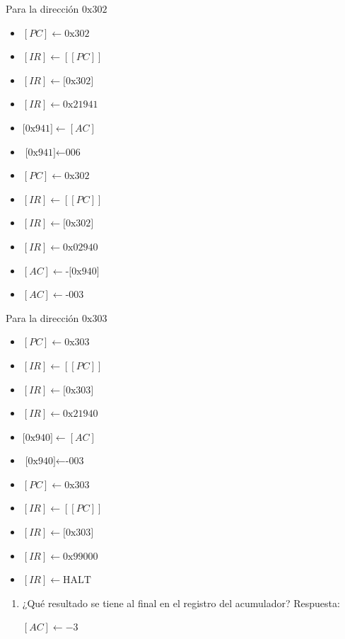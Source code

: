 \documentclass{article}
\begin{document}
Para la dirección \(\text{0x302}\)

\begin{itemize}
\item \([PC] \leftarrow \text{0x302}\)
\item \([IR] \leftarrow [[PC]]\)
\item \([IR] \leftarrow \text{[0x302]}\)
\item \([IR] \leftarrow \text{0x21941}\)
\item \(\text{[0x941]} \leftarrow [AC]\)
\item \(\text{[0x941]} \leftarrow \text{006}\)

\item \([PC] \leftarrow \text{0x302}\)
\item \([IR] \leftarrow [[PC]]\)
\item \([IR] \leftarrow \text{[0x302]}\)
\item \([IR] \leftarrow \text{0x02940}\)
\item \([AC] \leftarrow \text{-[0x940]}\)
\item \([AC] \leftarrow \text{-003}\)
\end{itemize}


Para la dirección \(\text{0x303}\)

\begin{itemize}
\item \([PC] \leftarrow \text{0x303}\)
\item \([IR] \leftarrow [[PC]]\)
\item \([IR] \leftarrow \text{[0x303]}\)
\item \([IR] \leftarrow \text{0x21940}\)
\item \(\text{[0x940]} \leftarrow [AC]\)
\item \(\text{[0x940]} \leftarrow \text{-003}\)

\item \([PC] \leftarrow \text{0x303}\)
\item \([IR] \leftarrow [[PC]]\)
\item \([IR] \leftarrow \text{[0x303]}\)
\item \([IR] \leftarrow \text{0x99000}\)
\item \([IR] \leftarrow \text{HALT}\)
\end{itemize}


\begin{enumerate}
\item ¿Qué resultado se tiene al final en el registro del acumulador?  
Respuesta:

\([AC] \leftarrow -3\)
\end{enumerate}
\end{document}
